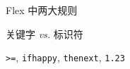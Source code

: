 \begin{frame}{}
  \begin{center}
    Flex 中两大规则

    \vspace{1.20cm}
     关键字 \emph{vs.} 标识符

    \vspace{0.60cm}
     \texttt{>=}, \texttt{ifhappy}, \texttt{thenext}, \texttt{1.23}
  \end{center}
\end{frame}
